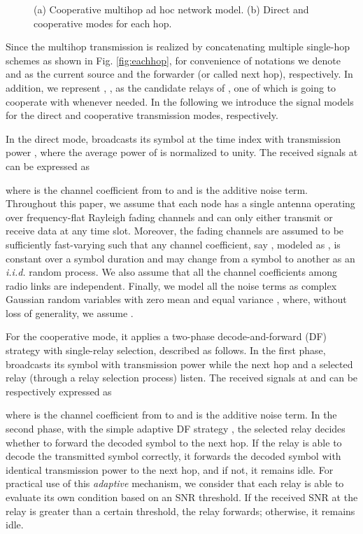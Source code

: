 \documentclass[journal,twoside,final]{IEEEtran}
\begin{document}
\begin{figure}[t!]
  \centering
             \caption{(a) Cooperative multihop ad hoc network model. (b) Direct and cooperative modes for each hop.}
  \label{fig:common_model}
\end{figure}

Since the multihop transmission is realized by concatenating multiple single-hop schemes as shown in Fig. \ref{fig:eachhop}, for convenience of notations we denote  and  as the current source and the forwarder (or called next hop), respectively. In addition, we represent , , as the candidate relays of , one of which is going to cooperate with  whenever needed.
In the following we introduce the signal models for the direct and cooperative transmission modes, respectively.

In the direct mode,  broadcasts its symbol  at the time index  with transmission power , where the average power of  is normalized to unity. The received signals at  can be expressed as

where  is the channel coefficient from  to  and  is the additive noise term. Throughout this paper, we assume that each node has a single antenna operating over frequency-flat Rayleigh fading channels and can only either transmit or receive data at any time slot. Moreover, the fading channels are assumed to be sufficiently fast-varying such that any channel coefficient, say , modeled as , is constant over a symbol duration and may change from a symbol to another as an \textit{i.i.d.} random process. We also assume that all the channel coefficients among radio links are independent. Finally, we model all the noise terms as complex Gaussian random variables with zero mean and equal variance , where, without loss of generality, we assume .


For the cooperative mode, it applies a two-phase decode-and-forward (DF) strategy with single-relay selection, described as follows. In the first phase,  broadcasts its symbol  with transmission power  while the next hop  and a selected relay  (through a relay selection process) listen. The received signals at  and  can be respectively expressed as


where  is the channel coefficient from  to  and  is the additive noise term. In the second phase, with the simple adaptive DF strategy \cite{HZF2004}, the selected relay decides whether to forward the decoded symbol to the next hop. If the relay is able to decode the transmitted symbol correctly, it forwards the decoded symbol with identical transmission power  to the next hop, and if not, it remains idle.
For practical use of this \textit{adaptive} mechanism, we consider that each relay is able to evaluate its own condition based on an SNR threshold. If the received SNR at the relay is greater than a certain threshold, the relay forwards; otherwise, it remains idle.
\end{document}

